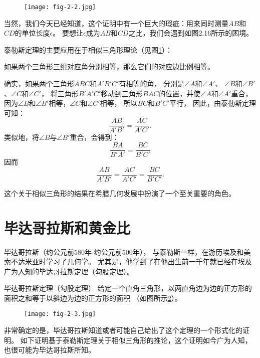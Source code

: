 \documentclass[cn,fancy,blue,11pt]{elegantbook}
\begin{document}
\begin{figure}[htbp]
	\centering
	\texttt{[image: fig-2-2.jpg]}
	\caption{\label{fig:2-2}}
\end{figure}

当然，我们今天已经知道，这个证明中有一个巨大的瑕疵：用来同时测量$AB$和$CD$的单位长度$\epsilon$。
要想让$\epsilon$成为$AB$和$CD$之比，我们会遇到如图2.16所示的困境。

泰勒斯定理的主要应用在于相似三角形理论（见图\ref{fig:2-2}）：

\begin{corollary*}{}{}
	如果两个三角形三组对应角分别相等，那么它们的对应边比例相等。
\end{corollary*}

确实，如果两个三角形$ABC$和$A'B'C'$有相等的角，
分别是$\angle A$和$\angle A'$、
$\angle B$和$\angle B'$、$\angle C$和$\angle C'$，
将三角形$B'A'C'$移动到三角形$BAC$的位置，并使$\angle A$和$\angle A'$重合，
因为$\angle B$和$\angle B'$相等，$\angle C$和$\angle C'$相等，
所以$BC$和$B'C'$平行，
因此，由泰勒斯定理可知：
\[\frac{AB}{A'B'}=\frac{AC}{A'C'}.\]
类似地，将$\angle B$与$\angle B'$重合，会得到：
\[\frac{BA}{B'A'}=\frac{BC}{B'C'}\]
因而
\[\frac{AB}{A'B'}=\frac{AC}{A'C'}=\frac{BC}{B'C'}.\]

这个关于相似三角形的结果在希腊几何发展中扮演了一个至关重要的角色。

\section{毕达哥拉斯和黄金比}

毕达哥拉斯（约公元前580年-约公元前500年），
与泰勒斯一样，在游历埃及和美索不达米亚时学习了几何学。
尤其是，他学到了在他出生前一千年就已经在埃及广为人知的毕达哥拉斯定理（勾股定理）。

\begin{theorem*}{毕达哥拉斯定理（勾股定理）}{}
	给定一个直角三角形，以两直角边为边的正方形的面积之和等于以斜边为边的正方形的面积
	（如图所示\ref{fig:2-3}）。
\end{theorem*}

\begin{figure}[htbp]
	\centering
	\texttt{[image: fig-2-3.jpg]}
	\caption{\label{fig:2-3}}
\end{figure}

非常确定的是，毕达哥拉斯知道或者可能自己给出了这个定理的一个形式化的证明。
如下证明基于泰勒斯定理关于相似三角形的推论，这个证明如今广为人知，也很可能为毕达哥拉斯所知。
\end{document}
